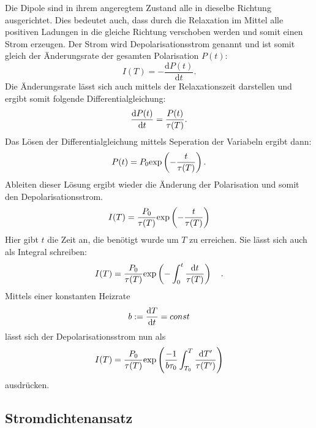 		Die Dipole sind in ihrem angeregtem Zustand alle in dieselbe Richtung ausgerichtet.
		Dies bedeutet auch, dass durch die Relaxation im Mittel alle positiven Ladungen in 
		die gleiche Richtung verschoben werden und somit einen Strom erzeugen.
		Der Strom wird Depolarisationsstrom genannt und ist somit gleich der Änderungsrate der 
		gesamten Polarisation $P(t)$:
		\begin{equation}
			I(T) = - \frac{\text{d}P(t)}{\text{d}t}.
		\end{equation}
		Die Änderungsrate lässt sich auch mittels der Relaxationszeit darstellen und ergibt somit 
		folgende Differentialgleichung:
		\begin{equation}
			\frac{\text{d} P(t)}{\text{d} t} = \frac{P(t)}{\tau(T)}.
			\label{eqn:diff}
		\end{equation}
		Das Lösen der Differentialgleichung mittels Seperation der Variabeln ergibt dann:
		\begin{equation}
			P(t) = P_0 \text{exp}\left(- \frac{t}{\tau(T)} \right).
		\end{equation}
		Ableiten dieser Lösung ergibt wieder die Änderung der Polarisation und somit den 
		Depolarisationsstrom.
		\begin{equation}
			I(T) = \frac{P_0}{\tau(T)} \text{exp}\left(-\frac{t}{\tau(T)}\right)
		\end{equation}
		Hier gibt $t$ die Zeit an, die benötigt wurde um $T$ zu erreichen.
		Sie lässt sich auch als Integral schreiben:
		\begin{equation}
			I(T) = \frac{P_0}{\tau(T)} \text{exp}\left(-\int_0^t\frac{\text{d}t}{\tau(T)}\right) \quad.
			\end{equation}
		Mittels einer konstanten Heizrate
		\begin{equation}
			b := \frac{\text{d} T}{\text{d} t} = const
		\end{equation}
		lässt sich der Depolarisationsstrom nun als 
		\begin{equation}
			I(T) = \frac{P_0}{\tau(T)} \text{exp}\left(\frac{-1}{b\tau_0}\int_{T_0}^T\frac{\text{d}T'}{\tau(T')}\right)
		\end{equation}
		ausdrücken.

	\subsection{Stromdichtenansatz}
		
